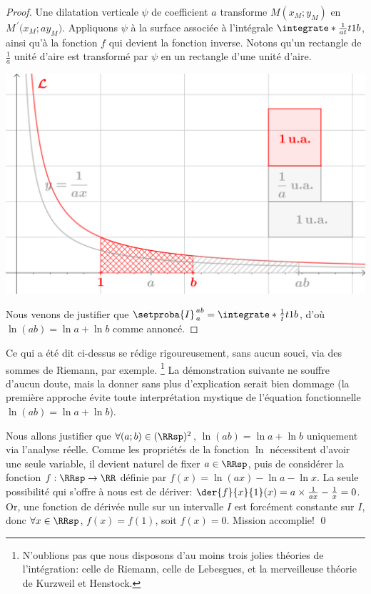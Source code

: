 \begin{proof}
	Une dilatation verticale $\psi$ de coefficient $a$ transforme $M(x_M ; y_M)$ en $M^{\,\prime}\big( x_M ; a y_M)$. 
	Appliquons $\psi$ à la surface associée à l'intégrale $\integrate*{\frac{1}{at}}{t}{1}{b}$, ainsi qu'à la fonction $f$ qui devient la fonction inverse. Notons qu'un rectangle de $\frac1a$ unité d'aire est transformé par $\psi$ en un rectangle d'une unité d'aire.

	\begin{center}
		\includegraphics[scale=.5]{content/ln/func-eq-3.png}
	\end{center}
	
	Nous venons de justifier que $\setproba{I}_{\,a}^{\,ab} = \integrate*{\frac{1}{t}}{t}{1}{b}$,
	d'où $\ln(a b) = \ln a + \ln b$ comme annoncé.
\end{proof}


\begin{remark}
	Ce qui a été dit ci-dessus se rédige rigoureusement, sans aucun souci, via des sommes de Riemann, par exemple.%
	\footnote{
		N'oublions pas que nous disposons d'au moins trois jolies théories de l'intégration:
    	celle de Riemann,
    	celle de Lebesgues,
    	et
    	la merveilleuse théorie de Kurzweil et Henstock.
	}
	La démonstration suivante ne souffre d'aucun doute, mais la donner sans plus d'explication serait bien dommage (la première approche évite toute interprétation mystique de l'équation fonctionnelle $\ln(a b) = \ln a + \ln b$). 
\end{remark}


{
\emph{\altproof{}}
	Nous allons justifier que 
	$\forall (a;b) \in ( \RRsp )^2$,
	$\ln(a b) = \ln a + \ln b$
	uniquement via l'analyse réelle.
	Comme les propriétés de la fonction $\ln$ nécessitent d'avoir une seule variable,
	il devient naturel de fixer $a \in \RRsp$, puis de considérer la fonction
	$f: \RRsp \to \RR$
	définie par
	$f(x) = \ln(a x) - \ln a - \ln x$.
	La seule possibilité qui s'offre à nous est de dériver:
	$\der{f}{x}{1}(x) = a \times \frac{1}{a x} - \frac1x = 0$.
	Or,
	une fonction de dérivée nulle sur un intervalle $I$ est forcément constante sur $I$,
	donc
	$\forall x \in \RRsp$,
	$f(x) = f(1)$,
	soit
	$f(x) = 0$.
	Mission accomplie!
\qed
}

